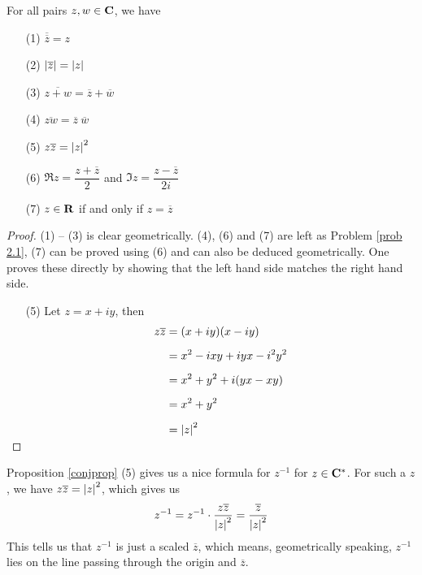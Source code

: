 \vspace*{1em}

\begin{proposition}\label{conjprop}
For all pairs $z,w \in \mathbf C$, we have
\begin{itemize}
\item[(1)] $\overline{\overline{z}} = z$
\item[(2)] $\left\lvert\overline{z}\right\rvert = \left\lvert z\right\rvert$
\item[(3)] $\overline{z + w} = \overline{z} + \overline{w}$
\item[(4)] $\overline{zw} = \overline{z}\ \overline{w}$
\item[(5)] $z\overline{z} = \left\lvert z\right\rvert^2$
\item[(6)] $\Re z = \dfrac{z + \overline{z}}{2}$ and $\Im z = \dfrac{z - \overline{z}}{2i}$
\item[(7)] $z \in \mathbf R$ if and only if $z = \overline{z}$
\end{itemize}
\end{proposition}
\begin{proof}
(1) -- (3) is clear geometrically. (4), (6) and (7) are left as Problem \ref{prob 2.1}, (7) can be proved using (6) and can also be deduced geometrically. One proves these directly by showing that the left hand side matches the right hand side.
\begin{itemize}
\item[(5)] Let $z = x + iy$, then
\begin{align*}
z\overline{z} &= (x + iy)(x - iy)\\[0.5em]
&= x^2 - ixy + iyx - i^2y^2\\[0.5em]
&= x^2 + y^2 + i(yx - xy)\\[0.5em]
&= x^2 + y^2\\[0.5em]
&= \left\lvert z\right\rvert^2\\[-1em]
\end{align*}
\end{itemize}
\vspace*{-\baselineskip}
\end{proof}


\begin{discussion}
Proposition \ref{conjprop} (5) gives us a nice formula for $z^{-1}$ for $z\in \mathbf C^*$. For such a $z$, we have $z\overline{z} = \left\lvert z\right\rvert^2$, which gives us
\[z^{-1} = z^{-1}\cdot \frac{z\overline{z}}{\left\lvert z\right\rvert^2} = \frac{\overline{z}}{\left\lvert z\right\rvert^2}\]
This tells us that $z^{-1}$ is just a scaled $\overline{z}$, which means, geometrically speaking, $z^{-1}$ lies on the line passing through the origin and $\overline{z}$.
\end{discussion}

